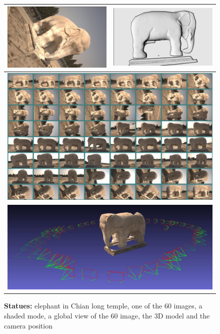 \begin{figure}
\begin{tabular}{||c|c||}
   \hline \hline
   \includegraphics[width=80mm]{FIGS/SAMPLES/DoocDOC-Eleph-Photo.jpg} &
   \includegraphics[width=80mm]{FIGS/SAMPLES/Doc-Elph-Shade.jpg}   \\ \hline  \hline
   \multicolumn{2}{||c||}{ \includegraphics[width=150mm]{FIGS/SAMPLES/Doc-Pl-Eleph.jpg}} \\ \hline  \hline
   \multicolumn{2}{||c||}{ \includegraphics[width=150mm]{FIGS/SAMPLES/Doc-Eleph-3D.jpg}} \\ \hline  \hline
\end{tabular}
\caption{{\bf Statues:} elephant in Chian long temple, one of the 60 images, a shaded mode, a global view of the 60 image,
the $3$D model and the camera position}
\label{View:Eleph}
\end{figure}

